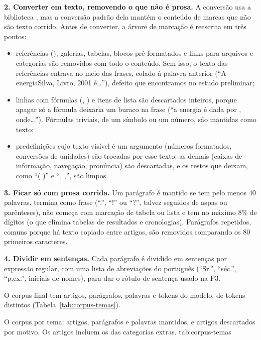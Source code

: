 \textbf{2. Converter em texto, removendo o que não é prosa.} A conversão usa a biblioteca
, mas a conversão padrão dela mantém o conteúdo de marcas que não são
texto corrido. Antes de converter, a árvore de marcação é reescrita em três pontos:
\begin{itemize}
    \item referências (), galerias, tabelas, blocos pré-formatados e links para arquivos
    e categorias são removidos com todo o conteúdo. Sem isso, o texto das referências entrava
    no meio das frases, colado à palavra anterior (``A energiaSilva, Livro, 2001 é\ldots''),
    defeito que encontramos no estudo preliminar;
    \item linhas com fórmulas (, ) e itens de lista são descartados
    inteiros, porque apagar só a fórmula deixaria um buraco na frase (``a energia é dada por ,
    onde\ldots''). Fórmulas triviais, de um símbolo ou um número, são mantidas como texto;
    \item predefinições cujo texto visível é um argumento (números formatados, conversões de
    unidades) são trocadas por esse texto; as demais (caixas de informação, navegação,
    pronúncia) são descartadas, e os restos que deixam, como ``( )'' e ``, ,'', são limpos.
\end{itemize}

\textbf{3. Ficar só com prosa corrida.} Um parágrafo é mantido se tem pelo menos 40 palavras,
termina como frase (``.'', ``!'' ou ``?'', talvez seguidos de aspas ou parênteses), não começa
com marcação de tabela ou lista e tem no máximo 8\% de dígitos (o que elimina tabelas de
resultados e cronologias). Parágrafos repetidos, comuns porque há texto copiado entre artigos,
são removidos comparando os 80 primeiros caracteres.

\textbf{4. Dividir em sentenças.} Cada parágrafo é dividido em sentenças por expressão
regular, com uma lista de abreviações do português (``Sr.'', ``séc.'', ``p.ex.'', iniciais de
nomes), para dar o rótulo de sentença usado na P3.

O corpus final tem \nArtigos{} artigos, \nParagrafos{} parágrafos, \nPalavrasCorpus{}
palavras e \nTokensCorpus{} tokens do modelo, de \nTiposCorpus{} tokens distintos
(Tabela~\ref{tab:corpus-temas}).

    {O corpus por tema: artigos, parágrafos e palavras mantidos, e artigos descartados por
    motivo. Os artigos incluem os das categorias extras.}
    {tab:corpus-temas}

